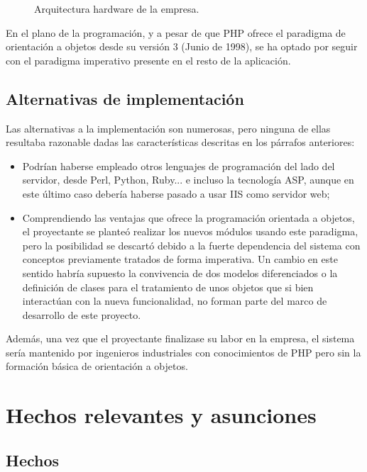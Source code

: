 \begin{figure}
\centering
{}
\caption{Arquitectura hardware de la empresa.}
\label{fig:arquitectura_iandi}
\end{figure}

En el plano de la programación, y a pesar de que PHP ofrece el paradigma de
orientación a objetos desde su versión 3 (Junio de 1998), se ha optado por
seguir con el paradigma imperativo presente en el resto de la aplicación.

\subsection{Alternativas de implementación}

Las alternativas a la implementación son numerosas, pero ninguna de ellas
resultaba razonable dadas las características descritas en los párrafos
anteriores:

\begin{itemize}
\item Podrían haberse empleado otros lenguajes de programación del lado del
servidor, desde Perl, Python, Ruby... e incluso la tecnología ASP, aunque
en este último caso debería haberse pasado a usar IIS como servidor web;

\item Comprendiendo las ventajas que ofrece la programación orientada a objetos,
el proyectante se planteó realizar los nuevos módulos usando este paradigma,
pero la posibilidad se descartó debido a la fuerte dependencia del sistema con
conceptos previamente tratados de forma imperativa. Un cambio en este sentido
habría supuesto la convivencia de dos modelos diferenciados o la definición de
clases para el tratamiento de unos objetos que si bien interactúan con la nueva
funcionalidad, no forman parte del marco de desarrollo de este proyecto.
\end{itemize}

Además, una vez que el proyectante finalizase su labor en la empresa, el sistema
sería mantenido por ingenieros industriales con conocimientos de PHP pero sin
la formación básica de orientación a objetos.

\section{Hechos relevantes y asunciones}

\subsection{Hechos}

